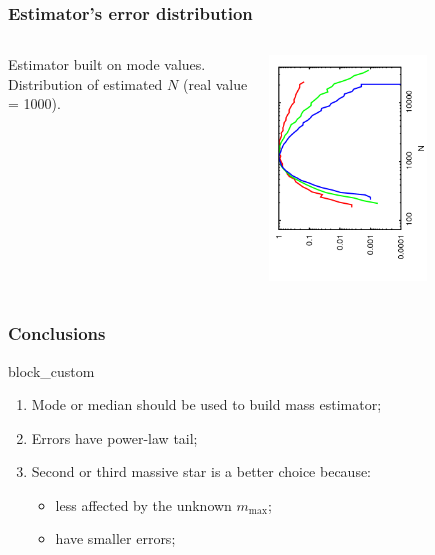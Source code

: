 \documentclass[14pt,green]{beamer}
\newcommand{\Mmax}{m_{\mathrm{max}}}
\begin{document}
\begin{frame}
  \frametitle{Estimator's error distribution}
  \begin{columns}
    \begin{column}{0.4\textwidth}
       Estimator built on mode values. Distribution of estimated $N$ (real value = 1000).
    \end{column}
    \begin{column}{0.6\textwidth}
      \begin{center}
        \includegraphics[angle=270, width=0.65\textwidth]{est_max.png}                                                             
      \end{center}
    \end{column}
  \end{columns}
\end{frame}

\begin{frame}
 \frametitle{Conclusions}
  \begin{beamercolorbox}[center, rounded=true]{block_custom}
\begin{enumerate}
 \item Mode or median should be used to build mass estimator;
 \item Errors have power-law tail;
 \item Second or third massive star is a better choice because:
 \begin{itemize}
  \item less affected by the unknown $\Mmax$;
  \item have smaller errors;
 \end{itemize}
\end{enumerate} 
  \end{beamercolorbox}
\end{frame}
\end{document}
